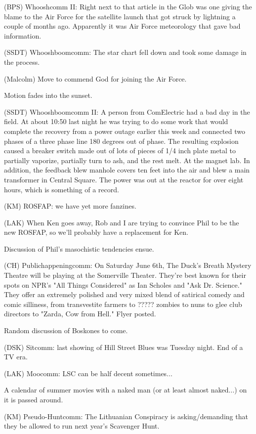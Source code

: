 \documentclass[12pt]{article}
\begin{document}
(BPS) Whooshcomm II: Right next to that article in the Glob was one giving the blame to the Air Force for the satellite launch that got struck by lightning a couple of months ago. Apparently it was Air Force meteorology that gave bad information.

(SSDT) Whooshboomcomm: The star chart fell down and took some damage in the process.

(Malcolm) Move to commend God for joining the Air Force.

Motion fades into the sunset.

(SSDT) Whooshboomcomm II: A person from ComElectric had a bad day in the field. At about 10:50 last night he was trying to do some work that would complete the recovery from a power outage earlier this week and connected two phases of a three phase line 180 degrees out of phase. The resulting explosion caused a breaker switch made out of lots of pieces of 1/4 inch plate metal to partially vaporize, partially turn to ash, and the rest melt. At the magnet lab. In addition, the feedback blew manhole covers ten feet into the air and blew a main transformer in Central Square. The power was out at the reactor for over eight hours, which is something of a record.

(KM) ROSFAP: we have yet more fanzines.

(LAK) When Ken goes away, Rob and I are trying to convince Phil to be the new ROSFAP, so we'll probably have a replacement for Ken.

Discussion of Phil's masochistic tendencies ensue.

(CH) Publichappeningcomm: On Saturday June 6th, The Duck's Breath Mystery Theatre will be playing at the Somerville Theater. They're best known for their spots on NPR's "All Things Considered" as Ian Scholes and "Ask Dr. Science." They offer an extremely polished and very mixed blend of satirical comedy and comic silliness, from transvestite farmers to ????? zombies to nuns to glee club directors to "Zarda, Cow from Hell." Flyer posted.

Random discussion of Boskones to come.

(DSK) Sitcomm: last showing of Hill Street Blues was Tuesday night. End of a TV era.

(LAK) Moocomm: LSC can be half decent sometimes...

A calendar of summer movies with a naked man (or at least almost naked...) on it is passed around.

(KM) Pseudo-Huntcomm: The Lithuanian Conspiracy is asking/demanding that they be allowed to run next year's Scavenger Hunt.
\end{document}
